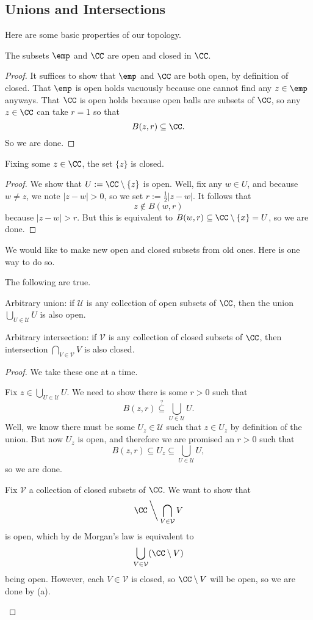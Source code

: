 \subsection{Unions and Intersections}
Here are some basic properties of our topology.
\begin{lemma}
	The subsets $\emp$ and $\CC$ are open and closed in $\CC$.
\end{lemma}
\begin{proof}
	It suffices to show that $\emp$ and $\CC$ are both open, by definition of closed. That $\emp$ is open holds vacuously because one cannot find any $z\in\emp$ anyways. That $\CC$ is open holds because open balls are subsets of $\CC$, so any $z\in\CC$ can take $r=1$ so that
	\[B(z,r)\subseteq\CC.\]
	So we are done.
\end{proof}
\begin{lemma}
	Fixing some $z\in\CC$, the set $\{z\}$ is closed.
\end{lemma}
\begin{proof}
	We show that $U:=\CC\setminus\{z\}$ is open. Well, fix any $w\in U$, and because $w\ne z$, we note $|z-w|>0$, so we set $r:=\frac12|z-w|$. It follows that
	\[z\notin B(w,r)\]
	because $|z-w|>r$. But this is equivalent to $B(w,r)\subseteq\CC\setminus\{x\}=U$, so we are done.
\end{proof}
We would like to make new open and closed subsets from old ones. Here is one way to do so.
\begin{lemma} \label{lem:arbitraryunionintersection}
	The following are true.
	\begin{listalph}
		\item Arbitrary union: if $\mathcal U$ is any collection of open subsets of $\CC$, then the union $\bigcup_{U\in\mathcal U}U$ is also open.
		\item Arbitrary intersection: if $\mathcal V$ is any collection of closed subsets of $\CC$, then intersection $\bigcap_{V\in\mathcal V}V$ is also closed.
	\end{listalph}
\end{lemma}
\begin{proof}
	We take these one at a time. 
	\begin{listalph}
		\item Fix $z\in\bigcup_{U\in\mathcal U}U$. We need to show there is some $r>0$ such that
		\[B(z,r)\stackrel?\subseteq\bigcup_{U\in\mathcal U}U.\]
		Well, we know there must be some $U_z\in\mathcal U$ such that $z\in U_z$ by definition of the union. But now $U_z$ is open, and therefore we are promised an $r>0$ such that
		\[B(z,r)\subseteq U_z\subseteq\bigcup_{U\in\mathcal U}U,\]
		so we are done.
		\item Fix $\mathcal V$ a collection of closed subsets of $\CC$. We want to show that
		\[\CC\mathbin{\bigg\backslash}\bigcap_{V\in\mathcal V}V\]
		is open, which by de Morgan's law is equivalent to
		\[\bigcup_{V\in\mathcal V}(\CC\setminus V)\]
		being open. However, each $V\in\mathcal V$ is closed, so $\CC\setminus V$ will be open, so we are done by (a).
		\qedhere
	\end{listalph}
\end{proof}
